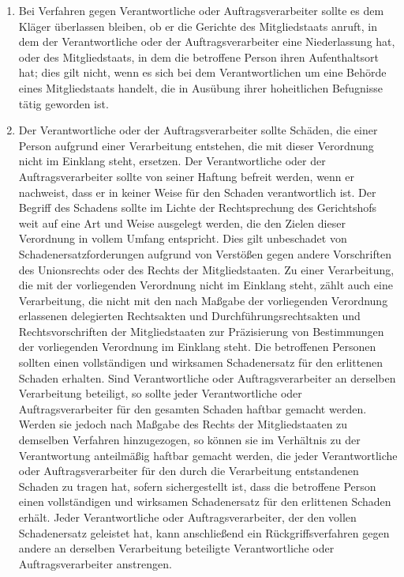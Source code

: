 \begin{enumerate}

   \item Bei Verfahren gegen Verantwortliche oder Auftragsverarbeiter sollte es dem Kläger überlassen bleiben, ob er die
    Gerichte des Mitgliedstaats anruft, in dem der Verantwortliche oder der Auftragsverarbeiter eine Niederlassung hat,
    oder des Mitgliedstaats, in dem die betroffene Person ihren Aufenthaltsort hat; dies gilt nicht, wenn es sich bei
    dem Verantwortlichen um eine Behörde eines Mitgliedstaats handelt, die in Ausübung ihrer hoheitlichen Befugnisse
    tätig geworden ist.%
   \label{itm:eg-145}
   

   \item Der Verantwortliche oder der Auftragsverarbeiter sollte Schäden, die einer Person aufgrund einer Verarbeitung
    entstehen, die mit dieser Verordnung nicht im Einklang steht, ersetzen. Der Verantwortliche oder der
    Auftragsverarbeiter sollte von seiner Haftung befreit werden, wenn er nachweist, dass er in keiner Weise für den
    Schaden verantwortlich ist. Der Begriff des Schadens sollte im Lichte der Rechtsprechung des Gerichtshofs weit auf
    eine Art und Weise ausgelegt werden, die den Zielen dieser Verordnung in vollem Umfang entspricht. Dies gilt
    unbeschadet von Schadenersatzforderungen aufgrund von Verstößen gegen andere Vorschriften des Unionsrechts oder des
    Rechts der Mitgliedstaaten. Zu einer Verarbeitung, die mit der vorliegenden Verordnung nicht im Einklang steht,
    zählt auch eine Verarbeitung, die nicht mit den nach Maßgabe der vorliegenden Verordnung erlassenen delegierten
    Rechtsakten und Durchführungsrechtsakten und Rechtsvorschriften der Mitgliedstaaten zur Präzisierung von
    Bestimmungen der vorliegenden Verordnung im Einklang steht. Die betroffenen Personen sollten einen vollständigen
    und wirksamen Schadenersatz für den erlittenen Schaden erhalten. Sind Verantwortliche oder Auftragsverarbeiter an
    derselben Verarbeitung beteiligt, so sollte jeder Verantwortliche oder Auftragsverarbeiter für den gesamten Schaden
    haftbar gemacht werden. Werden sie jedoch nach Maßgabe des Rechts der Mitgliedstaaten zu demselben Verfahren
    hinzugezogen, so können sie im Verhältnis zu der Verantwortung anteilmäßig haftbar gemacht werden, die jeder
    Verantwortliche oder Auftragsverarbeiter für den durch die Verarbeitung entstandenen Schaden zu tragen hat, sofern
    sichergestellt ist, dass die betroffene Person einen vollständigen und wirksamen Schadenersatz für den erlittenen
    Schaden erhält. Jeder Verantwortliche oder Auftragsverarbeiter, der den vollen Schadenersatz geleistet hat, kann
    anschließend ein Rückgriffsverfahren gegen andere an derselben Verarbeitung beteiligte Verantwortliche oder
    Auftragsverarbeiter anstrengen.%
   \label{itm:eg-146}
   

\end{enumerate}
